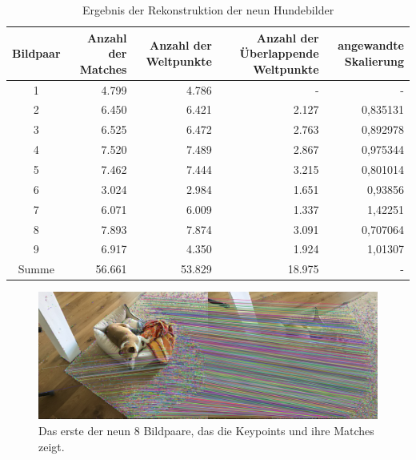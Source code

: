 \begin{table}
    \begin{tabularx}{\textwidth}{c r r r r}
        \toprule
        Bildpaar &  Anzahl der Matches & Anzahl der Weltpunkte & Anzahl der Überlappende Weltpunkte & angewandte Skalierung \\ 
        \midrule
        1 & 4.799 & 4.786 & -  & - \\
        2 & 6.450 & 6.421 & 2.127 & 0,835131 \\
        3 & 6.525 & 6.472 & 2.763 & 0,892978 \\
        4 & 7.520 & 7.489 & 2.867 & 0,975344 \\
        5 & 7.462 & 7.444 & 3.215 & 0,801014 \\
        6 & 3.024 & 2.984 & 1.651 & 0,93856  \\
        7 & 6.071 & 6.009 & 1.337 & 1,42251  \\
        8 & 7.893 & 7.874 & 3.091 & 0,707064 \\
        9 & 6.917 & 4.350 & 1.924 & 1,01307  \\
        \midrule
        Summe & 56.661 & 53.829 & 18.975 & - \\
        \bottomrule
    \end{tabularx}
    \caption{Ergebnis der Rekonstruktion der neun Hundebilder}
    \label{tab:dog-results}
\end{table}

\begin{figure}
    \includegraphics[width=\textwidth]{src/img/dog_first_pair_with_matches.jpg}
    \caption{Das erste der neun 8 Bildpaare, das die Keypoints und ihre Matches zeigt.}
    \label{fig:dog-first-pair-with-matches}
\end{figure}

